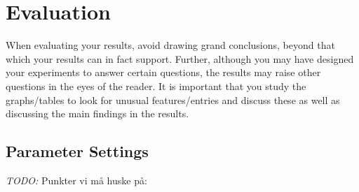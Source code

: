 \section{Evaluation}

When evaluating your results, avoid drawing grand conclusions, beyond that which your results can in fact support. Further, although you may have designed your experiments to answer certain questions, the results may raise other questions in the eyes of the reader. It is important that you study the graphs/tables to look for unusual features/entries and discuss these as well as discussing the main findings in the results. 

\subsection{Parameter Settings}
\emph{\color{blue} TODO:}
Punkter vi må huske på:

